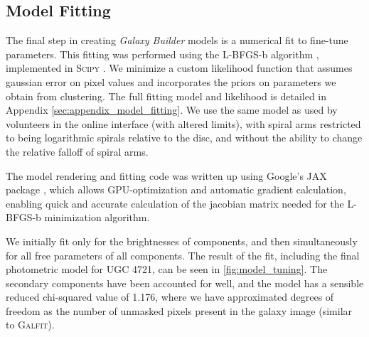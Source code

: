 \documentclass[trackchanges]{aastex63}
\begin{document}
\subsection{Model Fitting}

The final step in creating \textit{Galaxy Builder} models is a numerical fit to fine-tune parameters. This fitting was performed using the L-BFGS-b algorithm \citep{doi:10.1137/0916069}, implemented in \textsc{Scipy} \citep{scipy-paper}. We minimize a custom likelihood function that assumes gaussian error on pixel values and incorporates the priors on parameters we obtain from clustering. The full fitting model and likelihood is detailed in Appendix \ref{sec:appendix_model_fitting}. We use the same model as used by volunteers in the online interface (with altered limits), with spiral arms restricted to being logarithmic spirals relative to the disc, and without the ability to change the relative falloff of spiral arms.

The model rendering and fitting code was written up using Google's JAX package \citep{jax2018github}, which allows GPU-optimization and automatic gradient calculation, enabling quick and accurate calculation of the jacobian matrix needed for the L-BFGS-b minimization algorithm.

We initially fit only for the brightnesses of components, and then simultaneously for all free parameters of all components. The result of the fit, including the final photometric model for UGC 4721, can be seen in \ref{fig:model_tuning}. The secondary components have been accounted for well, and the model has a sensible reduced chi-squared value of 1.176, where we have approximated degrees of freedom as the number of unmasked pixels present in the galaxy image (similar to \textsc{Galfit}).

\begin{figure*}
  \caption{Effect of fitting on the aggregated models. The top left panel shows an Arcsinh-scaled image of the galaxy being fit (UGC 4721), the top middle shows the final model obtained (with the same limits and scaling as the galaxy image) and the top right shows the difference between the two images, in units of pixel uncertainty. The bottom panels show a simple representation of the model before and after tuning, overlaid on the galaxy image from the top-left panel. With minimal change to the aggregated components, we recover a detailed model that matches the galaxy exceptionally well, as evident in the residuals.}
  \label{fig:model_tuning}
\end{figure*}
\end{document}
